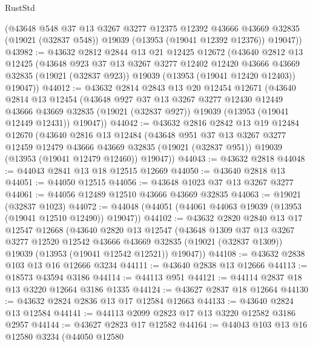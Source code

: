 \begin{lexlean}{RustStd}
\begin{coremodule}
      (@43648
        @548
        @37
        @13
        @3267
        @3277
        @12375
        @12392
        @43666
        @43669
        @32835
        (@19021 (@32837 @548))
        @19039
        (@13953 (@19041 @12392 @12376))
        @19047))
@43982 := @43632
    @2812
    @2844
    @13
    @21
    @12425
    @12672
    (@43640
      @2812
      @13
      @12425
      (@43648
        @923
        @37
        @13
        @3267
        @3277
        @12402
        @12420
        @43666
        @43669
        @32835
        (@19021 (@32837 @923))
        @19039
        (@13953 (@19041 @12420 @12403))
        @19047))
@44012 := @43632
    @2814
    @2843
    @13
    @20
    @12454
    @12671
    (@43640
      @2814
      @13
      @12454
      (@43648
        @927
        @37
        @13
        @3267
        @3277
        @12430
        @12449
        @43666
        @43669
        @32835
        (@19021 (@32837 @927))
        @19039
        (@13953 (@19041 @12449 @12431))
        @19047))
@44042 := @43632
    @2816
    @2842
    @13
    @19
    @12484
    @12670
    (@43640
      @2816
      @13
      @12484
      (@43648
        @951
        @37
        @13
        @3267
        @3277
        @12459
        @12479
        @43666
        @43669
        @32835
        (@19021 (@32837 @951))
        @19039
        (@13953 (@19041 @12479 @12460))
        @19047))
@44043 := @43632 @2818
@44048 := @44043 @2841 @13 @18 @12515 @12669
@44050 := @43640 @2818 @13
@44051 := @44050 @12515
@44056 := @43648 @1023 @37 @13 @3267 @3277
@44061 := @44056 @12489 @12510 @43666 @43669 @32835
@44063 := @19021 (@32837 @1023)
@44072 := @44048 (@44051 (@44061 @44063 @19039 (@13953 (@19041 @12510 @12490)) @19047))
@44102 := @43632
    @2820
    @2840
    @13
    @17
    @12547
    @12668
    (@43640
      @2820
      @13
      @12547
      (@43648
        @1309
        @37
        @13
        @3267
        @3277
        @12520
        @12542
        @43666
        @43669
        @32835
        (@19021 (@32837 @1309))
        @19039
        (@13953 (@19041 @12542 @12521))
        @19047))
@44108 := @43632 @2838 @103 @13 @16 @12666 @3234
@44111 := @43640 @2838 @13 @12666
@44113 := @18573 @43594 @3186
@44114 := @44113 @951
@44121 := @44114 @2837 @18 @13 @3220 @12664 @3186 @1335
@44124 := @43627 @2837 @18 @12664
@44130 := @43632 @2824 @2836 @13 @17 @12584 @12663
@44133 := @43640 @2824 @13 @12584
@44141 := @44113 @2099 @2823 @17 @13 @3220 @12582 @3186 @2957
@44144 := @43627 @2823 @17 @12582
@44164 := @44043
    @103
    @13
    @16
    @12580
    @3234
    (@44050
      @12580

\end{coremodule}
\end{lexlean}
